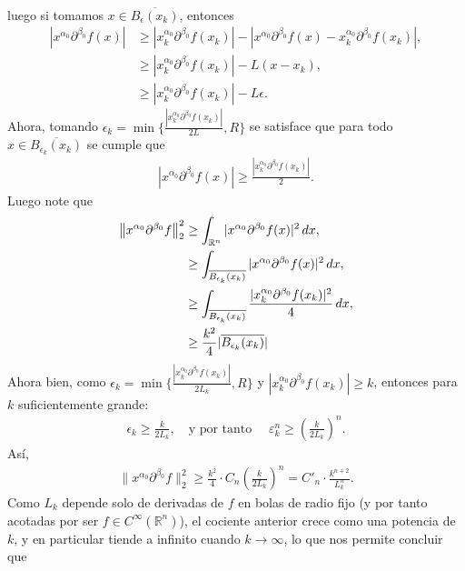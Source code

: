 \begin{homeworkProblem}
\begin{solution}
\begin{align*}
    \end{align*}
    luego si tomamos $x\in \overline{B_{\epsilon}(x_{k})}$, entonces
    \begin{align*}
      |x^{\alpha_{0}}\partial^{\beta_{0}}f(x)|&\geq|x_{k}^{\alpha_{0}}\partial^{\beta_{0}}f(x_{k})|-|x^{\alpha_{0}}\partial^{\beta_{0}}f(x)-x_{k}^{\alpha_{0}}\partial^{\beta_{0}}f(x_{k})|,\\
      &\geq |x_{k}^{\alpha_{0}}\partial^{\beta_{0}}f(x_{k})|-L(x-x_{k}),\\
      &\geq |x_{k}^{\alpha_{0}}\partial^{\beta_{0}}f(x_{k})|-L\epsilon.
    \end{align*}
    Ahora, tomando $\epsilon_{k}=\min\{\frac{|x_{k}^{\alpha_{0}}\partial^{\beta_{0}}f(x_{k})|}{2L},R\}$ se satisface que para todo $x\in \overline{B_{\epsilon_{k}}(x_{k})}$ se cumple que 
    \begin{align*}
      |x^{\alpha_{0}}\partial^{\beta_{0}}f(x)|\geq \frac{|x_{k}^{\alpha_{0}}\partial^{\beta_{0}}f(x_{k})|}{2}.
    \end{align*}
    Luego note que
    \begin{align*}
      \left\|x^{\alpha_{0}}\partial^{\beta_{0}}f\right\|_{2}^{2}&\geq \int_{\mathbb{R}^{n}}|x^{\alpha_{0}}\partial^{\beta_{0}}f(x)|^2\, dx,\\
      &\geq \int_{\overline{B_{\epsilon_{k}}(x_{k})}}|x^{\alpha_{0}}\partial^{\beta_{0}}f(x)|^2\, dx,\\
      &\geq \int_{\overline{B_{\epsilon_{k}}(x_{k})}}\frac{|x_{k}^{\alpha_{0}}\partial^{\beta_{0}}f(x_{k})|^2}{4}\, dx,\\
      &\geq \frac{k^2}{4}|\overline{B_{\epsilon_{k}}(x_{k})}|
    \end{align*}
    Ahora bien, como $\epsilon_k = \min\{ \frac{|x_k^{\alpha_0} \partial^{\beta_0} f(x_k)|}{2L_k}, R \}$ y $|x_k^{\alpha_0} \partial^{\beta_0} f(x_k)| \geq k$, entonces para $k$ suficientemente grande:
    \begin{align*}
      \epsilon_k \geq \frac{k}{2L_k}, \quad \text{y por tanto } \quad \varepsilon_k^n \geq \left( \frac{k}{2L_k} \right)^n.
    \end{align*}
    Así,
    \begin{align*}
      \|x^{\alpha_0} \partial^{\beta_0} f\|_2^2 \geq \frac{k^2}{4} \cdot C_n \left( \frac{k}{2L_k} \right)^n = C'_n \cdot \frac{k^{n+2}}{L_k^n}.
    \end{align*}
    Como $L_k$ depende solo de derivadas de $f$ en bolas de radio fijo (y por tanto acotadas por ser $f \in C^\infty(\mathbb{R}^{n})$), el cociente anterior crece como una potencia de $k$, y en particular tiende a infinito cuando $k\to\infty$, lo que nos permite concluir que

\end{solution}
\end{homeworkProblem}
